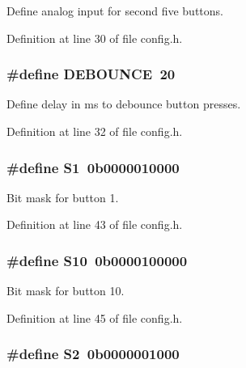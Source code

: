 Define analog input for second five buttons. 



Definition at line 30 of file config.\+h.

\subsubsection[{\texorpdfstring{D\+E\+B\+O\+U\+N\+CE}{DEBOUNCE}}]{\setlength{\rightskip}{0pt plus 5cm}\#define D\+E\+B\+O\+U\+N\+CE~20}\hypertarget{group__buttons_ga171ef18ea7b584f85234640a918da857}{}\label{group__buttons_ga171ef18ea7b584f85234640a918da857}


Define delay in ms to debounce button presses. 



Definition at line 32 of file config.\+h.

\subsubsection[{\texorpdfstring{S1}{S1}}]{\setlength{\rightskip}{0pt plus 5cm}\#define S1~0b0000010000}\hypertarget{group__buttons_ga690d30e9ad3647835c243368b36d4c41}{}\label{group__buttons_ga690d30e9ad3647835c243368b36d4c41}


Bit mask for button 1. 



Definition at line 43 of file config.\+h.

\subsubsection[{\texorpdfstring{S10}{S10}}]{\setlength{\rightskip}{0pt plus 5cm}\#define S10~0b0000100000}\hypertarget{group__buttons_ga1ff88b4fe56e1c80a371b1fbda4e4e74}{}\label{group__buttons_ga1ff88b4fe56e1c80a371b1fbda4e4e74}


Bit mask for button 10. 



Definition at line 45 of file config.\+h.

\subsubsection[{\texorpdfstring{S2}{S2}}]{\setlength{\rightskip}{0pt plus 5cm}\#define S2~0b0000001000}\hypertarget{group__buttons_gad5e70dee3c36d645b0eb1743b8a7d2bf}{}\label{group__buttons_gad5e70dee3c36d645b0eb1743b8a7d2bf}


